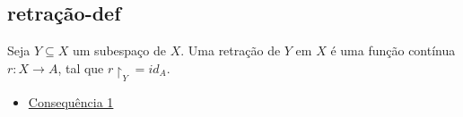 \subsection{retração-def}
\label{retração-def}


\begin{defi}[Retração]
Seja $Y \subseteq X$ um subespaço de $X$. Uma retração de $Y$ em $X$ é uma função contínua $r:X \longrightarrow A$, tal que $r\restriction_Y = id_A$.
\end{defi}


\begin{itemize}{Lista de consequências}
    \item \hyperref[teo-ponto-fixo-Brower]{Consequência 1}
\end{itemize}